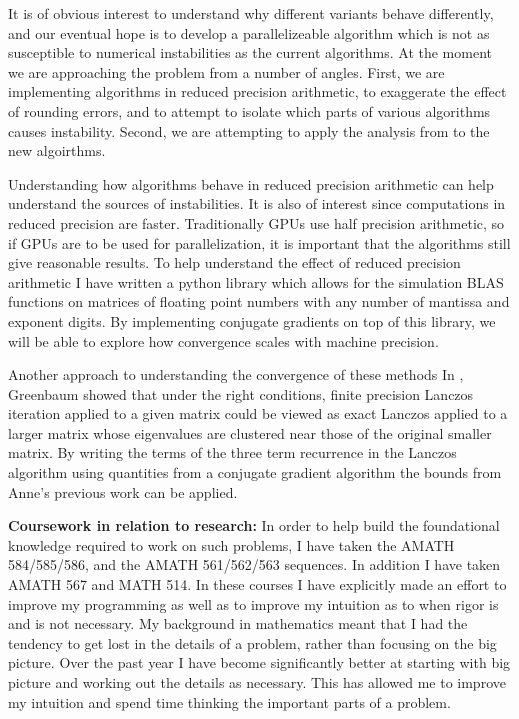 \documentclass[11pt]{article}
\begin{document}
It is of obvious interest to understand why different variants behave differently, and our eventual hope is to develop a parallelizeable algorithm which is not as susceptible to numerical instabilities as the current algorithms. At the moment we are approaching the problem from a number of angles. First, we are implementing algorithms in reduced precision arithmetic, to exaggerate the effect of rounding errors, and to attempt to isolate which parts of various algorithms causes instability. Second, we are attempting to apply the analysis from \cite{perturbed_lanczos} to the new algoirthms.

Understanding how algorithms behave in reduced precision arithmetic can help understand the sources of instabilities. It is also of interest since computations in reduced precision are faster. Traditionally GPUs use half precision arithmetic, so if GPUs are to be used for parallelization, it is important that the algorithms still give reasonable results. To help understand the effect of reduced precision arithmetic I have written a python library which allows for the simulation BLAS functions on matrices of floating point numbers with any number of mantissa and exponent digits. By implementing conjugate gradients on top of this library, we will be able to explore how convergence scales with machine precision.


Another approach to understanding the convergence of these methods In \cite{perturbed_lanczos}, Greenbaum showed that under the right conditions, finite precision Lanczos iteration applied to a given matrix could be viewed as exact Lanczos applied to a larger matrix whose eigenvalues are clustered near those of the original smaller matrix. By writing the terms of the three term recurrence in the Lanczos algorithm using quantities from a conjugate gradient algorithm the bounds from Anne's previous work can be applied.



\textbf{Coursework in relation to research:}
In order to help build the foundational knowledge required to work on such problems, I have taken the AMATH 584/585/586, and the AMATH 561/562/563 sequences. In addition I have taken AMATH 567 and MATH 514. In these courses I have explicitly made an effort to improve my programming as well as to improve my intuition as to when rigor is and is not necessary. My background in mathematics meant that I had the tendency to get lost in the details of a problem, rather than focusing on the big picture. Over the past year I have become significantly better at starting with big picture and working out the details as necessary. This has allowed me to improve my intuition and spend time thinking the important parts of a problem.
\end{document}
